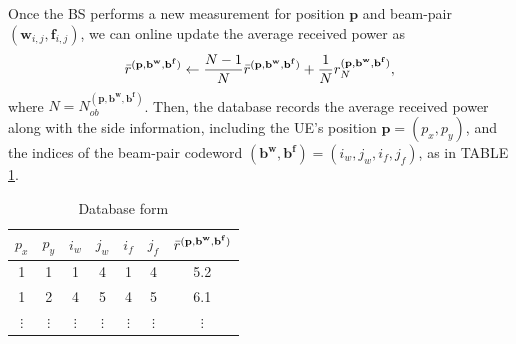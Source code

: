 \documentclass[12pt, draftcls, onecolumn]{IEEEtran}
\theoremstyle{plain}
\theoremstyle{definition}
\theoremstyle{remark}
\newcommand{\nt}[1]{\textcolor{red}{\textbf{[#1]}}}
\begin{document}
Once the BS performs a new measurement for position $\mathbf p$ and beam-pair $(\mathbf{w}_{i,j},\mathbf f_{i,j})$, we can online update the average received power as 
$$\Bar{r}^{(\mathbf{p},\mathbf{b}^{\mathbf w},\mathbf{b}^{\mathbf f})}\leftarrow \frac{N-1}{N}\Bar{r}^{(\mathbf{p},\mathbf{b}^{\mathbf w},\mathbf{b}^{\mathbf f})} + \frac{1}{N}{r}^{(\mathbf{p},\mathbf{b}^{\mathbf w},\mathbf{b}^{\mathbf f})}_N,$$
where $N=N_{ob}^{(\mathbf p,\mathbf{b}^{\mathbf w},\mathbf{b}^{\mathbf f})}$.
Then, the database records the average received power along with the side information, including the UE's position $\mathbf p =(p_x,p_y)$, and the indices of the beam-pair codeword $(\mathbf b^{\mathbf{w}},\mathbf b^{\mathbf{f}})=(i_w,j_w,i_f,j_f)$, as in TABLE \ref{table:database}.


\begin{table}[ht]
\caption{Database form} %
\label{table:database} %
\centering %
\begin{tabular}{c c c c c c  | c} %
\hline
\hline %
$p_x$ & $p_y$ & $i_w$ & $j_w$ & $i_f$ & $j_f$  & $\Bar{r}^{(\mathbf{p},\mathbf{b}^{\mathbf w},\mathbf{b}^{\mathbf f})}$ \\ [0.5ex] %
\hline %
 1 & 1  & 1 & 4 & 1 & 4  & 5.2 \\
 1 & 2  & 4 & 5 & 4 & 5  & 6.1\\
 $\vdots$ & $\vdots$ & $\vdots$ & $\vdots$ & $\vdots$& $\vdots$& $\vdots$\\ [1ex] %
\hline %
\hline %
\end{tabular}
\end{table}






\end{document}
